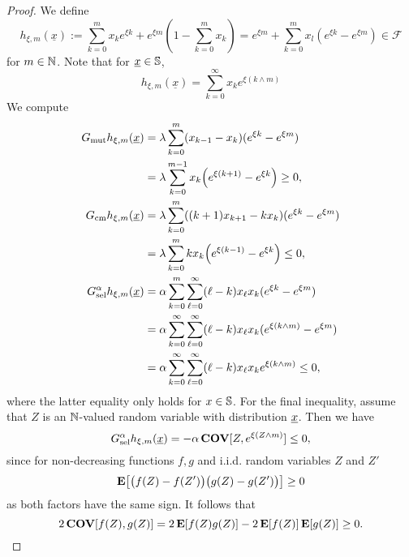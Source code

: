 \begin{proof}
We define 
$$ h_{\xi,m}(\underline x) := \sum_{k=0}^m x_k e^{\xi k}
+ e^{\xi m} \left( 1 - \sum_{k=0}^m x_k \right)
= e^{\xi m} + \sum_{k=0}^m x_l (e^{\xi k} - e^{\xi m})
\in \mathcal{F}
$$ 
for $m \in \mathbb{N}$. Note that for $\underline{x} \in \mathbb{S}$,
$$ h_{\xi,m}(\underline x) = \sum_{k=0}^\infty x_k e^{\xi(k \wedge m)} $$
We compute
\begin{equation} \label{da:eq:imp1}
\begin{aligned}
G_{\text{mut}} h_{\xi,m} \! \left( \underline{x} \right) 
& = \lambda \sum_{k=0}^m (x_{k-1} - x_k) (e^{\xi k} - e^{\xi m}) \\ 
&  = \lambda \sum_{k=0}^{m-1} x_k \Big( e^{\xi(k+1)} - e^{\xi k}\Big) \geq 0,\\
G_{\text{cm}} h_{\xi,m} \! \left( \underline{x} \right) 
& = \lambda \sum_{k=0}^m ((k+1)x_{k+1} - k x_k) (e^{\xi k} - e^{\xi m}) \\ 
&  = \lambda \sum_{k=0}^m k x_k \Big( e^{\xi(k-1)} - e^{\xi k}\Big) \leq 0,\\
G^{\alpha}_{\text{sel}} h_{\xi,m} \! \left( \underline{x} \right) 
& = \alpha \sum_{k=0}^m \sum_{\ell=0}^\infty (\ell-k) x_\ell x_k (e^{\xi k} - e^{\xi m}) \\
& = \alpha \sum_{k=0}^\infty \sum_{\ell=0}^\infty (\ell-k) x_\ell x_k (e^{\xi (k \wedge m)} - e^{\xi
m}) \\ 
& = \alpha \sum_{k=0}^\infty \sum_{\ell=0}^\infty (\ell-k) x_\ell x_k e^{\xi (k \wedge m)} \leq 0,
\end{aligned}
\end{equation}
where the latter equality only holds for $x\in\mathbb{S}$. For the final
inequality, assume that $Z$ is an $\mathbb{N}$-valued random variable with
distribution $\underline{x}$. 
Then we have 
$$ G^{\alpha}_{\text{sel}} h_{\xi,m} \! \left( \underline{x} \right) 
= - \alpha \, \mathbf{COV}[Z, e^{\xi (Z\wedge m)}] \leq 0,$$ 
since for non-decreasing functions $f,g$ and
i.i.d. random variables $Z$ and $Z'$
$$ \mathbf{E} \! \left[ \big(f(Z) - f(Z')\big)\big(g(Z) - g(Z')\big) \right] \geq 0 $$
as both factors have the same sign. It follows that
$$ 2 \, \mathbf{COV}[f(Z),g(Z)] = 2 \, \mathbf{E} \! \left[ f(Z)g(Z) \right] - 2 \, \mathbf{E} \! \left[ f(Z) \right] \mathbf{E} \! \left[ g(Z) \right]
\geq 0 .$$


\end{proof}
